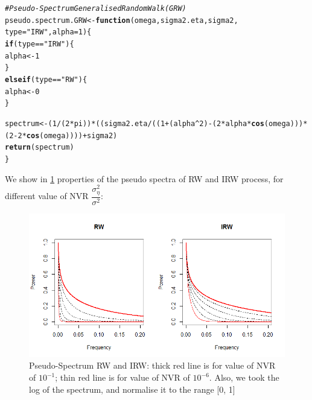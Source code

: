 \documentclass{article}\usepackage[]{graphicx}\usepackage[]{color}
\makeatletter
\newcommand{\hlnum}[1]{\textcolor[rgb]{0.686,0.059,0.569}{#1}}%
\newcommand{\hlstr}[1]{\textcolor[rgb]{0.192,0.494,0.8}{#1}}%
\newcommand{\hlcom}[1]{\textcolor[rgb]{0.678,0.584,0.686}{\textit{#1}}}%
\newcommand{\hlopt}[1]{\textcolor[rgb]{0,0,0}{#1}}%
\newcommand{\hlstd}[1]{\textcolor[rgb]{0.345,0.345,0.345}{#1}}%
\newcommand{\hlkwa}[1]{\textcolor[rgb]{0.161,0.373,0.58}{\textbf{#1}}}%
\newcommand{\hlkwb}[1]{\textcolor[rgb]{0.69,0.353,0.396}{#1}}%
\newcommand{\hlkwc}[1]{\textcolor[rgb]{0.333,0.667,0.333}{#1}}%
\newcommand{\hlkwd}[1]{\textcolor[rgb]{0.737,0.353,0.396}{\textbf{#1}}}%
\newenvironment{kframe}{%
 \def\at@end@of@kframe{}%
 \ifinner\ifhmode%
  \def\at@end@of@kframe{\end{minipage}}%
  \begin{minipage}{\columnwidth}%
 \fi\fi%
 \def\FrameCommand##1{\hskip\@totalleftmargin \hskip-\fboxsep
 \colorbox{shadecolor}{##1}\hskip-\fboxsep
     \hskip-\linewidth \hskip-\@totalleftmargin \hskip\columnwidth}%
 \MakeFramed {\advance\hsize-\width
   \@totalleftmargin\z@ \linewidth\hsize
   \@setminipage}}%
 {\par\unskip\endMakeFramed%
 \at@end@of@kframe}
\newenvironment{knitrout}{}{} %
\makeatother
\begin{document}
\begin{knitrout}\footnotesize
{}\color{fgcolor}\begin{kframe}
\begin{alltt}
\hlcom{# Pseudo-Spectrum Generalised Random Walk (GRW)}
\hlstd{pseudo.spectrum.GRW} \hlkwb{<-} \hlkwa{function}\hlstd{(}\hlkwc{omega}\hlstd{,} \hlkwc{sigma2.eta}\hlstd{,} \hlkwc{sigma2}\hlstd{,}
                                \hlkwc{type} \hlstd{=} \hlstr{"IRW"}\hlstd{,} \hlkwc{alpha} \hlstd{=} \hlnum{1}\hlstd{) \{}
  \hlkwa{if}\hlstd{(type} \hlopt{==} \hlstr{"IRW"}\hlstd{) \{}
    \hlstd{alpha} \hlkwb{<-} \hlnum{1}
  \hlstd{\}}
  \hlkwa{else if}\hlstd{(type} \hlopt{==} \hlstr{"RW"}\hlstd{) \{}
    \hlstd{alpha} \hlkwb{<-} \hlnum{0}
  \hlstd{\}}

  \hlstd{spectrum} \hlkwb{<-} \hlstd{(}\hlnum{1}\hlopt{/}\hlstd{(}\hlnum{2}\hlopt{*}\hlstd{pi))} \hlopt{*} \hlstd{(  (sigma2.eta}\hlopt{/}\hlstd{((}\hlnum{1} \hlopt{+} \hlstd{(alpha}\hlopt{^}\hlnum{2}\hlstd{)} \hlopt{-} \hlstd{(}\hlnum{2}\hlopt{*}\hlstd{alpha}\hlopt{*}\hlkwd{cos}\hlstd{(omega)) )} \hlopt{*}
                                             \hlstd{(}\hlnum{2} \hlopt{-} \hlnum{2}\hlopt{*}\hlkwd{cos}\hlstd{(omega))))} \hlopt{+} \hlstd{sigma2   )}
  \hlkwd{return}\hlstd{(spectrum)}
\hlstd{\}}
\end{alltt}
\end{kframe}
\end{knitrout}


We show in \ref{fig:ciao} properties of the pseudo spectra of RW and IRW process, for different value of NVR $\dfrac{\sigma^2_{\eta}}{\sigma^2}$:

\begin{figure}[htbp]
\centering
\includegraphics[scale = 0.5]{Plots/RWvsIRW.png}
\caption{Pseudo-Spectrum RW and IRW: thick red line is for value of NVR of $10^{-1}$; thin red line is for value of NVR of $10^{-6}$. Also, we took the log of the spectrum, and normalise it to the range [0, 1]}
\label{fig:ciao}
\end{figure}
\end{document}
